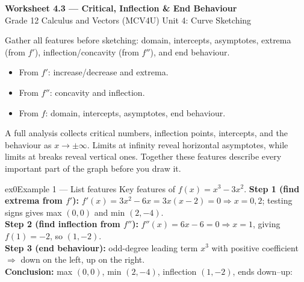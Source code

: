 \documentclass[11pt]{article}
\begin{document}
\begin{center}
{\LARGE\bfseries\color{titleblue}Worksheet 4.3 --- Critical, Inflection \& End Behaviour}\\[2pt]
{\small Grade 12 Calculus and Vectors (MCV4U) \textperiodcentered{} Unit 4: Curve Sketching}
\end{center}

\begin{ideabox}
Gather all features before sketching: domain, intercepts, asymptotes, extrema (from $f'$), inflection/concavity (from $f''$), and end behaviour.
\begin{itemize}[leftmargin=*,itemsep=2pt]
  \item From $f'$: increase/decrease and extrema.
  \item From $f''$: concavity and inflection.
  \item From $f$: domain, intercepts, asymptotes, end behaviour.
\end{itemize}
\end{ideabox}

\begin{learnbox}
A full analysis collects critical numbers, inflection points, intercepts, and the behaviour as $x\to\pm\infty$.
Limits at infinity reveal horizontal asymptotes, while limits at breaks reveal vertical ones.
Together these features describe every important part of the graph before you draw it.
\end{learnbox}


\begin{example}{ex0}{Example 1 --- List features}
Key features of $f(x)=x^3-3x^2$.\soln
\textbf{Step 1 (find extrema from $f'$):} $f'(x)=3x^2-6x=3x(x-2)=0\Rightarrow x=0,2$; testing signs gives max $(0,0)$ and min $(2,-4)$.\\[3pt]
\textbf{Step 2 (find inflection from $f''$):} $f''(x)=6x-6=0\Rightarrow x=1$, giving $f(1)=-2$, so $(1,-2)$.\\[3pt]
\textbf{Step 3 (end behaviour):} odd-degree leading term $x^3$ with positive coefficient $\Rightarrow$ down on the left, up on the right.\\[3pt]
\textbf{Conclusion:} max $(0,0)$, min $(2,-4)$, inflection $(1,-2)$, ends down--up:
\end{example}
\end{document}
